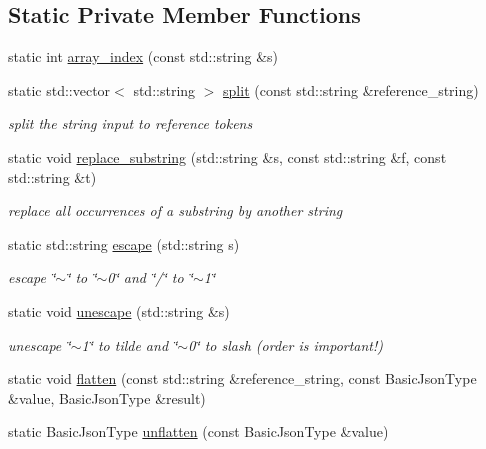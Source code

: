 \subsection*{Static Private Member Functions}
\begin{DoxyCompactItemize}
\item 
static int \hyperlink{classnlohmann_1_1json__pointer_ac53f5b79dd91da78743c437832f57ce4}{array\+\_\+index} (const std\+::string \&s)
\item 
static std\+::vector$<$ std\+::string $>$ \hyperlink{classnlohmann_1_1json__pointer_ae01c32c6a071c2e5198d5dfcce290e50}{split} (const std\+::string \&reference\+\_\+string)
\begin{DoxyCompactList}\small\item\em split the string input to reference tokens \end{DoxyCompactList}\item 
static void \hyperlink{classnlohmann_1_1json__pointer_aa7649d30da9fc10b0e20704a27aea2a9}{replace\+\_\+substring} (std\+::string \&s, const std\+::string \&f, const std\+::string \&t)
\begin{DoxyCompactList}\small\item\em replace all occurrences of a substring by another string \end{DoxyCompactList}\item 
static std\+::string \hyperlink{classnlohmann_1_1json__pointer_a8abf3577f9a0087f29a233893cdc73ad}{escape} (std\+::string s)
\begin{DoxyCompactList}\small\item\em escape \char`\"{}$\sim$\char`\"{} to \char`\"{}$\sim$0\char`\"{} and \char`\"{}/\char`\"{} to \char`\"{}$\sim$1\char`\"{} \end{DoxyCompactList}\item 
static void \hyperlink{classnlohmann_1_1json__pointer_ab85442d5fbcc289b79beeefc2175446f}{unescape} (std\+::string \&s)
\begin{DoxyCompactList}\small\item\em unescape \char`\"{}$\sim$1\char`\"{} to tilde and \char`\"{}$\sim$0\char`\"{} to slash (order is important!) \end{DoxyCompactList}\item 
static void \hyperlink{classnlohmann_1_1json__pointer_ab0d7759d0caa6a0c0187916da28e6ee7}{flatten} (const std\+::string \&reference\+\_\+string, const Basic\+Json\+Type \&value, Basic\+Json\+Type \&result)
\item 
static Basic\+Json\+Type \hyperlink{classnlohmann_1_1json__pointer_a920065221e3c81676c3211c100d024a7}{unflatten} (const Basic\+Json\+Type \&value)
\end{DoxyCompactItemize}
